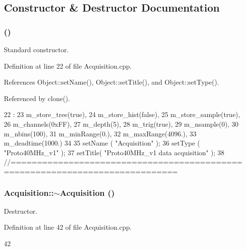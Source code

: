 \subsection{Constructor \& Destructor Documentation}
\hypertarget{classAcquisition_aa7d3138495a4a8888c21b33f4d657732}{
\subsubsection[{Acquisition}]{ ()}}
\label{classAcquisition_aa7d3138495a4a8888c21b33f4d657732}


Standard constructor. 

Definition at line 22 of file Acquisition.cpp.

References Object::setName(), Object::setTitle(), and Object::setType().

Referenced by clone().


\begin{DoxyCode}
22                            :
23   m_store_tree(true),
24   m_store_hist(false),
25   m_store_sample(true),
26   m_channels(0xFF),
27   m_depth(5),
28   m_trig(true),
29   m_nsample(0),
30   m_nbins(100),
31   m_minRange(0.),
32   m_maxRange(4096.),
33   m_deadtime(1000.)
34 {
35   setName ( "Acquisition" );
36   setType ( "Proto40MHz_v1" );
37   setTitle( "Proto40MHz_v1 data acquisition" );
38 }
//=============================================================================
\end{DoxyCode}
\hypertarget{classAcquisition_a3b0205ba385e2da70abb5a351c4dbf0f}{
\subsubsection[{$\sim$Acquisition}]{\setlength{\rightskip}{0pt plus 5cm}Acquisition::$\sim$Acquisition ()}}
\label{classAcquisition_a3b0205ba385e2da70abb5a351c4dbf0f}


Destructor. 

Definition at line 42 of file Acquisition.cpp.


\begin{DoxyCode}
42 {} 
\end{DoxyCode}


